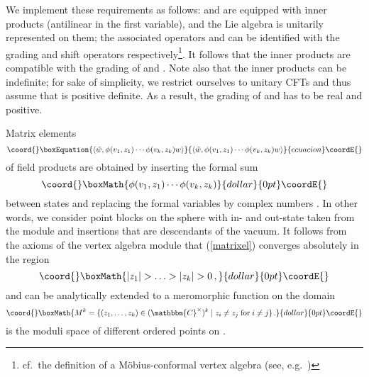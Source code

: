 \documentclass[a4paper,12pt,twoside]{article}
\renewcommand{\b}{\langle}
\renewcommand{\k}{\rangle}
\providecommand{\bC}{\mathbbm{C}}
\providecommand{\bCc}{\mathbbm{C}^{\times}}
\providecommand{\eq}[1]{(\ref{#1})}
\providecommand{\wt}{\tilde{w}}
\begin{document}
We implement these requirements as follows:
\coordHE{} and \coordHE{} are equipped with inner products \myHighlight{$\b\;,\;\k$}\coordHE{} (antilinear in the
first variable),
and the Lie algebra \myHighlight{${\rm sl}(2,\bC)$}\coordHE{} is unitarily represented on them;
the associated operators \coordHE{} and \coordHE{} can be identified with the grading
and shift operators respectively\footnote{cf.\ the definition of a
M\"{o}bius-conformal vertex algebra (see, e.g.\ \cite{Kac})}.
It follows that the inner products are compatible
with the grading of \coordHE{} and \coordHE{}. Note also that
the inner products can be indefinite; for sake of simplicity, we restrict
ourselves to unitary CFTs and
thus assume that \myHighlight{$\b\;,\;\k$}\coordHE{} is positive definite.
As a result, the grading of \coordHE{} and \coordHE{} has to be real and positive.

Matrix elements
\begin{equation}\coord{}\boxEquation{
\label{matrixel}
\b\wt, \phi(v_1,z_1)\cdots\phi(v_k,z_k)w\k
}{
\b\wt, \phi(v_1,z_1)\cdots\phi(v_k,z_k)w\k
}{ecuacion}\coordE{}\end{equation}
of field products are obtained by inserting
the formal sum
$$\coord{}\boxMath{\phi(v_1,z_1)\cdots\phi(v_k,z_k)}{dollar}{0pt}\coordE{}$$
between states \myHighlight{$w, \wt\in W$}\coordHE{}
and replacing the formal variables by complex numbers \coordHE{}.
In other words, we consider \coordHE{} point blocks on the sphere with
in- and out-state taken from the module \coordHE{} and \coordHE{} insertions that are
descendants of the vacuum.
It follows from the axioms of the vertex algebra module
that \eq{matrixel}
converges absolutely in the region
$$\coord{}\boxMath{|z_1|>\ldots>|z_k|> 0\,,}{dollar}{0pt}\coordE{}$$
and can be analytically extended to a meromorphic function
on the domain
$$\coord{}\boxMath{M^k = \{(z_1,\ldots,z_k)\in (\bCc)^k\;|\;z_i\ne
z_j\;\mbox{for}\;
i\ne
j\}\,.}{dollar}{0pt}\coordE{}$$  \coordHE{} is the moduli space of \coordHE{} different ordered points
on \myHighlight{$\bCc$}\coordHE{}.
\end{document}
